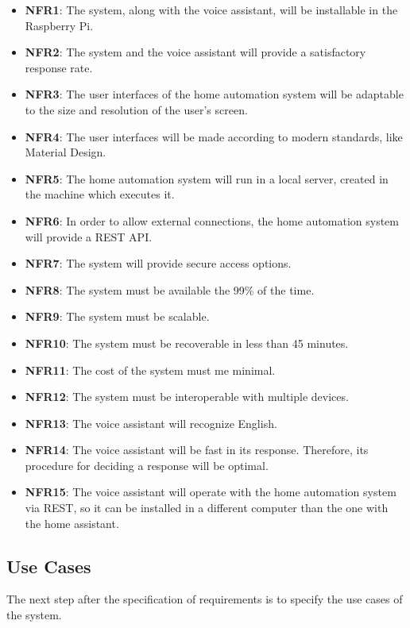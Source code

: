 \begin{itemize}
    \item \textbf{NFR1}: The system, along with the voice assistant, will be installable in the Raspberry Pi.
    \item \textbf{NFR2}: The system and the voice assistant will provide a satisfactory response rate.
    \item \textbf{NFR3}: The user interfaces of the home automation system will be adaptable to the size and resolution of the
    user's screen.
    \item \textbf{NFR4}: The user interfaces will be made according to modern standards, like Material Design.
    \item \textbf{NFR5}: The home automation system will run in a local server, created in the machine which executes it.
    \item \textbf{NFR6}: In order to allow external connections, the home automation system will provide a REST API.
    \item \textbf{NFR7}: The system will provide secure access options.
    \item \textbf{NFR8}: The system must be available the 99\% of the time.
    \item \textbf{NFR9}: The system must be scalable.
    \item \textbf{NFR10}: The system must be recoverable in less than 45 minutes.
    \item \textbf{NFR11}: The cost of the system must me minimal.
    \item \textbf{NFR12}: The system must be interoperable with multiple devices.
    \item \textbf{NFR13}: The voice assistant will recognize English.
    \item \textbf{NFR14}: The voice assistant will be fast in its response. Therefore, its procedure for deciding a response will 
    be optimal.
    \item \textbf{NFR15}: The voice assistant will operate with the home automation system via REST, so it can be installed in a
    different computer than the one with the home assistant.
\end{itemize}

\subsection{Use Cases}
The next step after the specification of requirements is to specify the use cases of the system.

